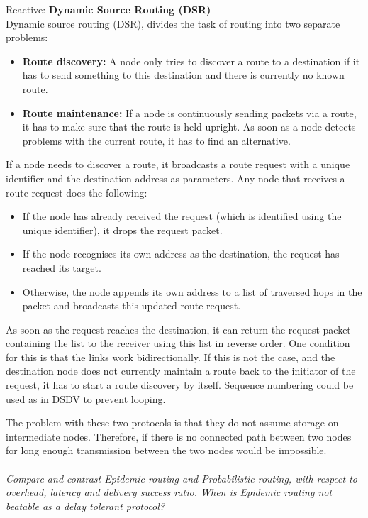 \documentclass[12pt]{article}
\newcommand*\circled[1]{\tikz[baseline=(char.base)]{
		\node[shape=circle,draw,inner sep=0pt] (char) {#1};}}
\begin{document}
Reactive: \textbf{Dynamic Source Routing (DSR)}\\
Dynamic source routing (DSR), divides the task of routing into two
separate problems:
\begin{itemize}
    \item \textbf{Route discovery:} A node only tries to discover a route to
        a destination if it has to send something to this destination and there
        is currently no known route.
    \item \textbf{Route maintenance:} If a node is continuously sending packets
        via a route, it has to make sure that the route is held upright. As
        soon as a node detects problems with the current route, it has to find
        an alternative.
\end{itemize}
If a node needs to discover a route, it broadcasts a route request with
a unique identifier and the destination address as parameters. Any node that
receives a route request does the following:
\begin{itemize}
    \item If the node has already received the request (which is identified
        using the unique identifier), it drops the request packet.
    \item If the node recognises its own address as the destination, the request
        has reached its target.
    \item Otherwise, the node appends its own address to a list of traversed
        hops in the packet and broadcasts this updated route request.
\end{itemize}
As soon as the request reaches the destination, it can return the request packet
containing the list to the receiver using this list in reverse order. One
condition for this is that the links work bidirectionally. If this is not the
case, and the destination node does not currently maintain a route back to the
initiator of the request, it has to start a route discovery by itself. Sequence
numbering could be used as in DSDV to prevent looping.

The problem with these two protocols is that they do not assume storage on
intermediate nodes. Therefore, if there is no connected path between two nodes
for long enough transmission between the two nodes would be impossible.
\\
\\
\textit{\circled{6.} Compare and contrast Epidemic routing and Probabilistic
routing, with respect to overhead, latency and delivery success ratio. When is
Epidemic routing not beatable as a delay tolerant protocol?}
\end{document}
